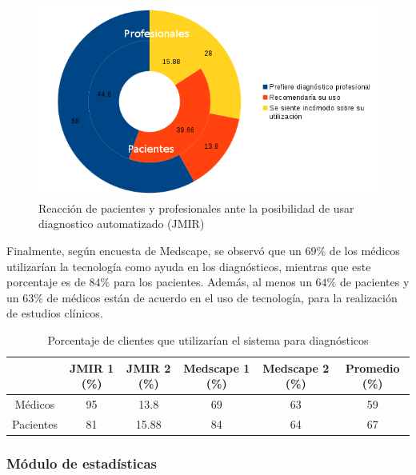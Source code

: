 \documentclass[a4paper,10pt]{article}
\begin{document}
\begin{center}
\begin{figure}[H]
\centering
\includegraphics[width=1\textwidth]{./Imagenes/g2.png}
\caption{Reacción de pacientes y profesionales ante la posibilidad de usar diagnostico automatizado (JMIR)}
\label{fig:hp}
\end{figure}
\end{center}


Finalmente, según encuesta de Medscape, se observó que un $69\%$ de los médicos utilizarían la tecnología como ayuda en los diagnósticos, mientras que este porcentaje es de $84\%$ para los pacientes. Además, al menos un $64\%$ de pacientes y un $63\%$ de médicos están de acuerdo en el uso de tecnología, para la realización de estudios clínicos.

\begin{table} [H]
\begin{center}
\begin{tabular}{|c|c|c|c|c|c|}
\hline
			&JMIR 1 (\%)	&JMIR 2 (\%)	&Medscape 1 (\%)	&Medscape 2 (\%)	&Promedio (\%)\\\hline
Médicos		&95							&13.8						&69							&63									&59\\\hline
Pacientes	&81							&15.88						&84							&64									&67\\\hline
\end{tabular}
\end{center}
\caption{Porcentaje de clientes que utilizarían el sistema para diagnósticos}
\end{table}

\subsubsection{Módulo de estadísticas}
\end{document}
